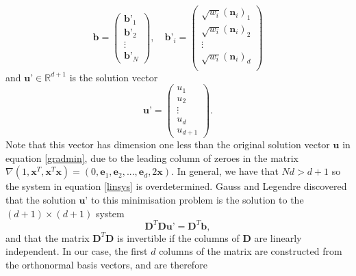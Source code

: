 \documentclass[final,3p,times,twocolumn]{elsarticle}
\begin{document}
\begin{equation}
 \textbf{b} = \left( \begin{array}{c}
                      \textbf{b'}_1 \\ 
                      \textbf{b'}_2 \\ 
                      \vdots \\
                      \textbf{b'}_N
                     \end{array} \right), \quad
      \textbf{b'}_i = \left( \begin{array}{c}
                      \sqrt{w_i} (\textbf{n}_i)_1 \\ 
                      \sqrt{w_i} (\textbf{n}_i)_2 \\ 
                      \vdots \\
                      \sqrt{w_i} (\textbf{n}_i)_d \\ 
                     \end{array} \right)
\end{equation}
and $\textbf{u'} \in \mathbb{R}^{d+1}$ is the solution vector
\begin{equation}
 \textbf{u'} = \left( \begin{array}{c}
                      u_1 \\
                      u_2 \\
                      \vdots \\
                      u_d \\
                      u_{d+1}
                     \end{array} \right).
\end{equation}
Note that this vector has dimension one less than the original solution vector
$\textbf{u}$ in equation \ref{gradmin}, due to the leading column of zeroes in
the matrix $\nabla ( 1, \textbf{x}^T, \textbf{x}^T\textbf{x} ) = (0, \textbf{e}_1, \textbf{e}_2, ..., \textbf{e}_d, 2\textbf{x})$. 
In general, we have that $Nd > d+1$ so the system in equation \ref{linsys} is
overdetermined. Gauss and Legendre discovered that the solution $\textbf{u'}$
to this minimisation problem is the solution to the $(d+1) \times (d+1)$ system
\begin{equation}
 \textbf{D}^T\textbf{D}\textbf{u'} = \textbf{D}^T\textbf{b},
\end{equation}
and that the matrix $\textbf{D}^T\textbf{D}$ is invertible if the columns
of $\textbf{D}$ are linearly independent. In our case, the first $d$ columns of
the matrix are constructed from the orthonormal basis vectors, and are therefore
\end{document}
